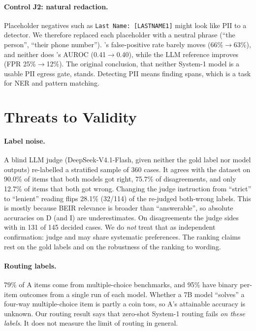 \paragraph{Control J2: natural redaction.}
Placeholder negatives such as \texttt{Last Name: [LASTNAME1]} might look like PII to a detector. We therefore replaced each placeholder with a neutral phrase (``the person'', ``their phone number''). \jev{}'s false-positive rate barely moves (66\%$\to$63\%), and neither does \laya{}'s AUROC (0.41$\to$0.40), while the LLM reference improves (FPR 25\%$\to$12\%). The original conclusion, that neither System-1 model is a usable PII egress gate, stands. Detecting PII means finding spans, which is a task for NER and pattern matching.

\section{Threats to Validity}\label{sec:threats}
\paragraph{Label noise.}
A blind LLM judge (DeepSeek-V4.1-Flash, given neither the gold label nor model outputs) re-labelled a stratified sample of 360 cases. It agrees with the dataset on 90.0\% of items that both models got right, 75.7\% of disagreements, and only 12.7\% of items that both got wrong. Changing the judge instruction from ``strict'' to ``lenient'' reading flips 28.1\% (32/114) of the re-judged both-wrong labels. This is mostly because BEIR relevance is broader than ``answerable'', so absolute accuracies on D (and I) are underestimates. On disagreements the judge sides with \jev{} in 131 of 145 decided cases. We do \emph{not} treat that as independent confirmation: judge and \jev{} may share systematic preferences. The ranking claims rest on the gold labels and on the robustness of the ranking to wording.

\paragraph{Routing labels.}
79\% of A items come from multiple-choice benchmarks, and 95\% have binary per-item outcomes from a single run of each model. Whether a 7B model ``solves'' a four-way multiple-choice item is partly a coin toss, so A's attainable accuracy is unknown. Our routing result says that zero-shot System-1 routing fails \emph{on these labels}. It does not measure the limit of routing in general.


